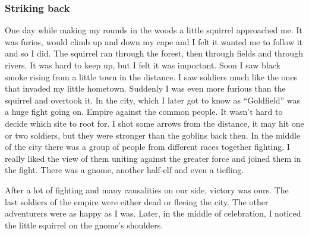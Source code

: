 \documentclass[letterpaper,10pt,twoside,twocolumn,openany]{book}
\begin{document}
	\subsubsection{Striking back}
	One day while making my rounds in the woods a little squirrel approached me. It was furios, would climb up and down my cape and I felt it wanted me to follow it and so I did. The squirrel ran through the forest, then through fields and through rivers. It was hard to keep up, but I felt it was important. Soon I saw black smoke rising from a little town in the distance. I saw soldiers much like the ones that invaded my little hometown. Suddenly I was even more furious than the squirrel and overtook it. In the city, which I later got to know as “Goldfield” was a huge fight going on. Empire against the common people. It wasn’t hard to decide which site to root for. I shot some arrows from the distance, it may hit one or two soldiers, but they were stronger than the goblins back then. In the middle of the city there was a group of people from different races together fighting. I really liked the view of them uniting against the greater force and joined them in the fight. There was a gnome, another half-elf and even a tiefling. 
	
	After a lot of fighting and many causalities on our side, victory was ours. The last soldiers of the empire were either dead or fleeing the city. The other adventurers were as happy as I was. Later, in the middle of celebration, I noticed the little squirrel on the gnome’s shoulders. 
	
	




		
		
		

	
\end{document}
